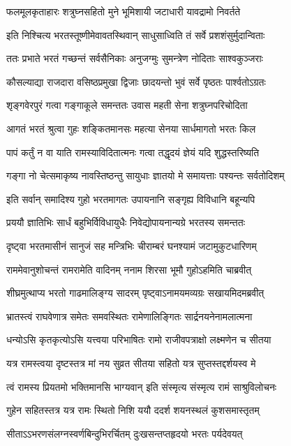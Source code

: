 \twolineshloka
{फलमूलकृताहारः शत्रुघ्नसहितो मुने}
{भूमिशायी जटाधारी यावद्रामो निवर्तते} %

\twolineshloka
{इति निश्चित्य भरतस्तूष्णीमेवावतस्थिवान्}
{साधुसाध्विति तं सर्वे प्रशशंसुर्मुदान्विताः} %

\twolineshloka
{ततः प्रभाते भरतं गच्छन्तं सर्वसैनिकाः}
{अनुजग्मुः सुमन्त्रेण नोदिताः साश्वकुञ्जराः} %

\twolineshloka
{कौसल्याद्या राजदारा वसिष्ठप्रमुखा द्विजाः}
{छादयन्तो भुवं सर्वे पृष्ठतः पार्श्वतोऽग्रतः} %

\twolineshloka
{शृङ्गवेरपुरं गत्वा गङ्गाकूले समन्ततः}
{उवास महती सेना शत्रुघ्नपरिचोदिता} %

\twolineshloka
{आगतं भरतं श्रुत्वा गुहः शङ्कितमानसः}
{महत्या सेनया सार्धमागतो भरतः किल} %

\twolineshloka
{पापं कर्तुं न वा याति रामस्याविदितात्मनः}
{गत्वा तद्धृदयं ज्ञेयं यदि शुद्धस्तरिष्यति} %

\twolineshloka
{गङ्गा नो चेत्समाकृष्य नावस्तिष्ठन्तु सायुधाः}
{ज्ञातयो मे समायत्ताः पश्यन्तः सर्वतोदिशम्} %

\twolineshloka
{इति सर्वान् समादिश्य गुहो भरतमागतः}
{उपायनानि सङ्गृह्य विविधानि बहून्यपि} %

\twolineshloka
{प्रययौ ज्ञातिभिः सार्धं बहुभिर्विविधायुधैः}
{निवेद्योपायनान्यग्रे भरतस्य समन्ततः} %

\twolineshloka
{दृष्ट्वा भरतमासीनं सानुजं सह मन्त्रिभिः}
{चीराम्बरं घनश्यामं जटामुकुटधारिणम्} %

\twolineshloka
{राममेवानुशोचन्तं रामरामेति वादिनम्}
{ननाम शिरसा भूमौ गुहोऽहमिति चाब्रवीत्} %

\twolineshloka
{शीघ्रमुत्थाप्य भरतो गाढमालिङ्ग्य सादरम्}
{पृष्ट्वाऽनामयमव्यग्रः सखायमिदमब्रवीत्} %

\twolineshloka
{भ्रातस्त्वं राघवेणात्र समेतः समवस्थितः}
{रामेणालिङ्गितः सार्द्रनयनेनामलात्मना} %

\twolineshloka
{धन्योऽसि कृतकृत्योऽसि यत्त्वया परिभाषितः}
{रामो राजीवपत्राक्षो लक्ष्मणेन च सीतया} %

\twolineshloka
{यत्र रामस्त्वया दृष्टस्तत्र मां नय सुव्रत}
{सीतया सहितो यत्र सुप्तस्तद्दर्शयस्व मे} %

\twolineshloka
{त्वं रामस्य प्रियतमो भक्तिमानसि भाग्यवान्}
{इति संस्मृत्य संस्मृत्य रामं साश्रुविलोचनः} %

\twolineshloka
{गुहेन सहितस्तत्र यत्र रामः स्थितो निशि}
{ययौ ददर्श शयनस्थलं कुशसमास्तृतम्} %

\twolineshloka
{सीताऽऽभरणसंलग्नस्वर्णबिन्दुभिरर्चितम्}
{दुःखसन्तप्तहृदयो भरतः पर्यदेवयत्} %

